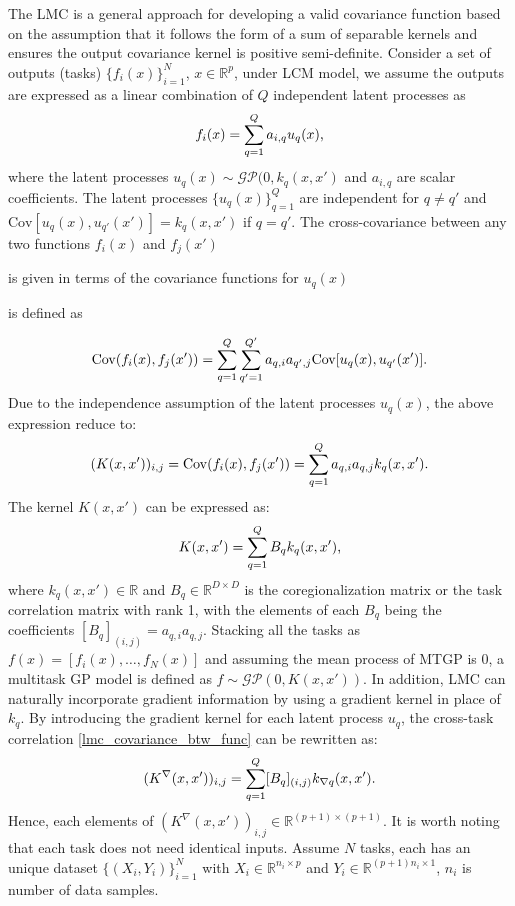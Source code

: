 \documentclass[conference]{IEEEtran}
\begin{document}
The LMC \cite{alvarez2012kernelsvectorvaluedfunctionsreview} is a general approach for developing a valid covariance function based on the assumption that it follows the form of a sum of separable kernels and ensures the output covariance kernel is positive semi-definite. Consider a set of outputs (tasks) $\{f_i(x)\}_{i=1}^N$, $x \in \mathbb{R}^p$, under LCM model, we assume the outputs are expressed as a linear combination of $Q$ independent latent processes as
\begin{equation}
    f_i(x) = \sum_{q = 1}^Q a_{i,q} u_q(x)\text,
\end{equation}
where the latent processes $u_q(x) \sim \mathcal{GP}(0, k_q(x,x')$ and $a_{i,q}$ are scalar coefficients. 
The latent processes $\{u_q(x)\}_{q = 1}^Q$ are independent for $q \neq q'$ and $\mathrm{Cov}[u_q(x), u_{q'}(x')] = k_q(x,x')$ if $q=q'$. 
The cross-covariance between any two functions $f_i(x)$ and $f_j(x')$ 

is given in terms of the covariance functions for $u_q(x)$ 

is defined as 

\begin{equation}
    \mathrm{Cov}(f_i(x), f_j(x')) = \sum_{q  = 1}^Q \sum_{q' = 1}^{Q'} a_{q,i} a_{q',j} \mathrm{Cov}[u_q(x), u_{q'}(x')]\text.
\end{equation}
Due to the independence assumption of the latent processes $u_q(x)$, the above expression reduce to:
\begin{equation}
    (K(x,x'))_{i,j} = \mathrm{Cov}(f_i(x), f_j(x')) = \sum_{q=1}^Qa_{q,i}a_{q,j}k_q(x,x')\text.
    \label{lmc_covariance_btw_func}
\end{equation}
The kernel $K(x,x')$ can be expressed as:
\begin{equation}
    K(x,x') = \sum_{q=1}^QB_qk_q(x,x')\text,
\end{equation}
where $k_q(x,x') \in \mathbb{R}$ and $B_q \in \mathbb{R}^{{D\times D}}$ is the coregionalization matrix or the task correlation matrix with rank 1, with the elements of each $B_q$ being the coefficients $[B_q]_{(i,j)} = a_{q,i}a_{q,j}$. Stacking all the tasks as $\mathbf{}f(x) = [f_i(x), \dots, f_N(x)]$ and assuming the mean process of MTGP is $0$, a multitask GP model is defined as $f \sim \mathcal{GP}(0, K(x,x'))$. In addition, LMC can naturally incorporate gradient information by using a gradient kernel in place of $k_q$. By introducing the gradient kernel for each latent process $u_q$, the cross-task correlation \eqref{lmc_covariance_btw_func} can be rewritten as:
\begin{equation}
    (K^\nabla(x,x'))_{i,j} = \sum_{q=1}^Q[B_q]_{(i,j)}k_{\nabla q}(x,x')\text.
    \label{lmc_grad_kernel}
\end{equation}
Hence, each elements of $(K^\nabla(x,x'))_{i,j} \in \mathbb{R}^{(p+1) \times (p+1)}$. It is worth noting that each task does not need identical inputs. Assume $N$ tasks, each has an unique dataset $\{(X_i, Y_i)\}_{i=1}^N$ with $X_i \in \mathbb{R}^{n_i \times p}$ and $Y_i \in \mathbb{R}^{(p+1)n_i \times 1}$, $n_i$ is number of data samples. 
\end{document}
